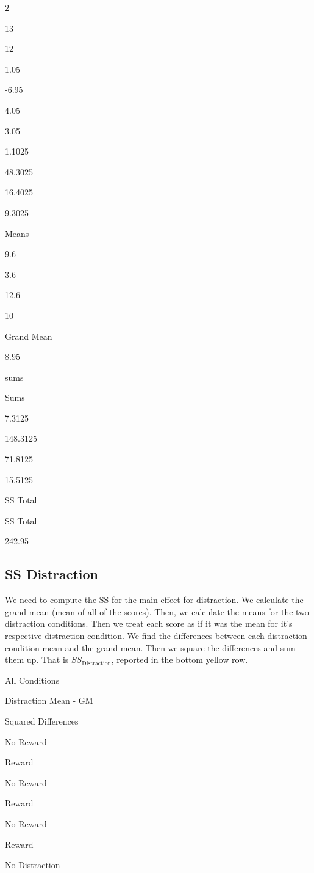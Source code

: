 \documentclass[
]{book}
\begin{document}
2

13

12

1.05

-6.95

4.05

3.05

1.1025

48.3025

16.4025

9.3025

Means

9.6

3.6

12.6

10

Grand Mean

8.95

sums

Sums

7.3125

148.3125

71.8125

15.5125

SS Total

SS Total

242.95

\hypertarget{ss-distraction}{%
\subsection{SS Distraction}\label{ss-distraction}}

We need to compute the SS for the main effect for distraction. We calculate the grand mean (mean of all of the scores). Then, we calculate the means for the two distraction conditions. Then we treat each score as if it was the mean for it's respective distraction condition. We find the differences between each distraction condition mean and the grand mean. Then we square the differences and sum them up. That is \(SS_\text{Distraction}\), reported in the bottom yellow row.

All Conditions

Distraction Mean - GM

Squared Differences

No Reward

Reward

No Reward

Reward

No Reward

Reward

No Distraction
\end{document}
